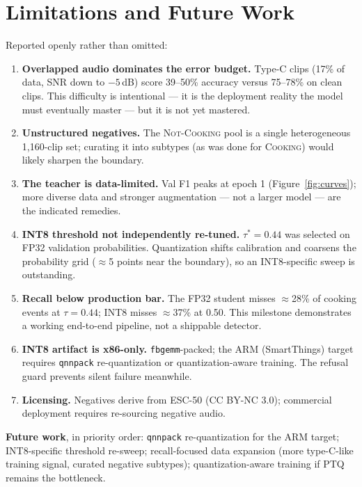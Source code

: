 \documentclass[11pt,a4paper]{article}
\newcommand{\cooking}{\textsc{Cooking}}
\newcommand{\notcooking}{\textsc{Not-Cooking}}
\begin{document}
\section{Limitations and Future Work}\label{sec:limits}

Reported openly rather than omitted:

\begin{enumerate}[itemsep=3pt,topsep=3pt]
  \item \textbf{Overlapped audio dominates the error budget.} Type-C clips
        (17\% of data, SNR down to $-5$\,dB) score 39--50\% accuracy versus
        75--78\% on clean clips. This difficulty is intentional --- it is the
        deployment reality the model must eventually master --- but it is not
        yet mastered.
  \item \textbf{Unstructured negatives.} The \notcooking{} pool is a single
        heterogeneous 1{,}160-clip set; curating it into subtypes (as was done
        for \cooking{}) would likely sharpen the boundary.
  \item \textbf{The teacher is data-limited.} Val F1 peaks at epoch 1
        (Figure~\ref{fig:curves}); more diverse data and stronger
        augmentation --- not a larger model --- are the indicated remedies.
  \item \textbf{INT8 threshold not independently re-tuned.} $\tau^\ast=0.44$
        was selected on FP32 validation probabilities. Quantization shifts
        calibration and coarsens the probability grid
        ($\approx$5 points near the boundary), so an INT8-specific sweep is
        outstanding.
  \item \textbf{Recall below production bar.} The FP32 student misses
        $\approx$28\% of cooking events at $\tau=0.44$; INT8 misses
        $\approx$37\% at 0.50. This milestone demonstrates a working
        end-to-end pipeline, not a shippable detector.
  \item \textbf{INT8 artifact is x86-only.} \texttt{fbgemm}-packed; the ARM
        (SmartThings) target requires \texttt{qnnpack} re-quantization or
        quantization-aware training. The refusal guard prevents silent
        failure meanwhile.
  \item \textbf{Licensing.} Negatives derive from ESC-50 (CC BY-NC 3.0);
        commercial deployment requires re-sourcing negative audio.
\end{enumerate}

\noindent\textbf{Future work}, in priority order: \texttt{qnnpack}
re-quantization for the ARM target; INT8-specific threshold re-sweep;
recall-focused data expansion (more type-C-like training signal, curated
negative subtypes); quantization-aware training if PTQ remains the
bottleneck.
\end{document}

